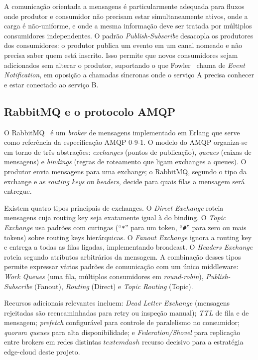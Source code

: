 \documentclass[10pt,a4paper]{article}
\begin{document}
A comunica\c{c}\~ao orientada a mensagens \'e particularmente adequada para fluxos onde produtor e consumidor n\~ao precisam estar simultaneamente ativos, onde a carga \'e n\~ao-uniforme, e onde a mesma informa\c{c}\~ao deve ser tratada por m\'ultiplos consumidores independentes. O padr\~ao \emph{Publish-Subscribe} desacopla os produtores dos consumidores: o produtor publica um evento em um canal nomeado e n\~ao precisa saber quem est\'a inscrito. Isso permite que novos consumidores sejam adicionados sem alterar o produtor, suportando o que Fowler~\cite{fowler2017eda} chama de \emph{Event Notification}, em oposi\c{c}\~ao a chamadas s\'\i ncronas onde o servi\c{c}o A precisa conhecer e estar conectado ao servi\c{c}o B.

\subsection{RabbitMQ e o protocolo AMQP}

O RabbitMQ~\cite{rabbitmq} \'e um \emph{broker} de mensagens implementado em Erlang que serve como refer\^encia da especifica\c{c}\~ao AMQP 0-9-1. O modelo do AMQP organiza-se em torno de tr\^es abstra\c{c}\~oes: \emph{exchanges} (pontos de publica\c{c}\~ao), \emph{queues} (caixas de mensagens) e \emph{bindings} (regras de roteamento que ligam exchanges a queues). O produtor envia mensagens para uma exchange; o RabbitMQ, segundo o tipo da exchange e as \emph{routing keys} ou \emph{headers}, decide para quais filas a mensagem ser\'a entregue.

Existem quatro tipos principais de exchanges. O \emph{Direct Exchange} roteia mensagens cuja routing key seja exatamente igual \`a do binding. O \emph{Topic Exchange} usa padr\~oes com curingas (``\texttt{*}'' para um token, ``\texttt{\#}'' para zero ou mais tokens) sobre routing keys hier\'arquicas. O \emph{Fanout Exchange} ignora a routing key e entrega a todas as filas ligadas, implementando broadcast. O \emph{Headers Exchange} roteia segundo atributos arbitr\'arios da mensagem. A combina\c{c}\~ao desses tipos permite expressar v\'arios padr\~oes de comunica\c{c}\~ao com um \'unico middleware: \emph{Work Queues} (uma fila, m\'ultiplos consumidores em \emph{round-robin}), \emph{Publish-Subscribe} (Fanout), \emph{Routing} (Direct) e \emph{Topic Routing} (Topic).

Recursos adicionais relevantes incluem: \emph{Dead Letter Exchange} (mensagens rejeitadas s\~ao reencaminhadas para retry ou inspe\c{c}\~ao manual); \emph{TTL} de fila e de mensagem; \emph{prefetch} configur\'avel para controle de paralelismo no consumidor; \emph{quorum queues} para alta disponibilidade; e \emph{Federation/Shovel} para replica\c{c}\~ao entre brokers em redes distintas \(textemdash\) recurso decisivo para a estrat\'egia edge-cloud deste projeto.
\end{document}
